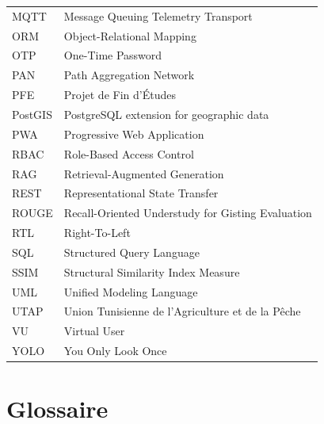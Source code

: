 \documentclass[12pt,a4paper,twoside]{report}
\newcounter{hi}
\begin{document}
\begin{longtable}{lp{10cm}}
MQTT & Message Queuing Telemetry Transport \\
ORM & Object-Relational Mapping \\
OTP & One-Time Password \\
PAN & Path Aggregation Network \\
PFE & Projet de Fin d'Études \\
PostGIS & PostgreSQL extension for geographic data \\
PWA & Progressive Web Application \\
RBAC & Role-Based Access Control \\
RAG & Retrieval-Augmented Generation \\
REST & Representational State Transfer \\
ROUGE & Recall-Oriented Understudy for Gisting Evaluation \\
RTL & Right-To-Left \\
SQL & Structured Query Language \\
SSIM & Structural Similarity Index Measure \\
UML & Unified Modeling Language \\
UTAP & Union Tunisienne de l'Agriculture et de la Pêche \\
VU & Virtual User \\
YOLO & You Only Look Once \\
\bottomrule
\end{longtable}

\chapter*{Glossaire}
\end{document}
